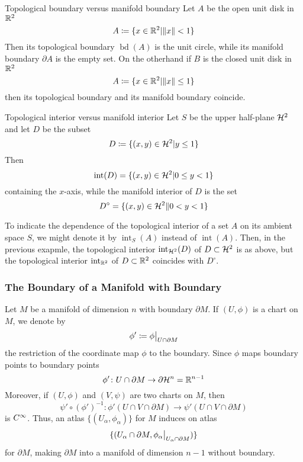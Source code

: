 \begin{example}{Topological boundary versus manifold boundary}{}
    Let \(A\) be the open unit disk in \(\mathbb{R}^2\)
    \[
        A \coloneqq \{ x \in \mathbb{R}^2 | \norm{x} < 1 \}    
    \]
    Then its topological boundary \(\operatorname{bd}(A)\) is the unit circle, while its manifold boundary \(\partial A\) is the empty set.
    On the otherhand if \(B\) is the closed unit disk in \(\mathbb{R}^2\)
    \[
        A \coloneqq \{ x \in \mathbb{R}^2 | \norm{x} \leq 1 \}    
    \]
    then its topological boundary and its manifold boundary coincide.
\end{example}
\begin{example}{Topological interior versus manifold interior}{}
    Let \(S\) be the upper half-plane \(\mathcal{H}^2\) and let \(D\) be the subset 
    \[
        D \coloneqq \{ (x,y) \in \mathcal{H}^2 | y \leq 1 \}    
    \]
    Then 
    \[
        \operatorname{int}(D) = \{(x,y) \in \mathcal{H}^2 | 0 \leq y < 1\}   
    \]
    containing the \(x\)-axis, while the manifold interior of \(D\) is the set 
    \[
        D^\circ = \{ (x,y) \in \mathcal{H}^2 \| 0 < y < 1 \}    
    \]
\end{example}

To indicate the dependence of the topological interior of a set \(A\) on its ambient space \(S\), we might denote it by \(\operatorname{int}_S (A)\) instead of \(\operatorname{int}(A)\).
Then, in the previous exapmle, the topological interior \(\operatorname{int}_{\mathcal{H}^2}(D)\) of \(D \subset \mathcal{H}^2\) is as above, but the topological interior \(\operatorname{int}_{\mathbb{R}^2}\) of \(D \subset \mathbb{R}^2\) coincides with \(D^\circ\).

\subsubsection{The Boundary of a Manifold with Boundary}

Let \(M\) be a manifold of dimension \(n\) with boundary \(\partial M\). 
If \((U, \phi)\) is a chart on \(M\), we denote by 
\[
    \phi' \coloneqq \evalat[\big]{\phi}{U \cap \partial M}
\]
the restriction of the coordinate map \(\phi\) to the boundary.
Since \(\phi\) maps boundary points to boundary points 
\[
    \phi' \colon U \cap \partial M \rightarrow \partial \mathcal{H}^n = \mathbb{R}^{n-1}    
\]
Moreover, if \((U, \phi)\) and \((V, \psi)\) are two charts on \(M\), then 
\[
    \psi' \circ (\phi')^{-1} \colon \phi'(U \cap V \cap \partial M) \rightarrow \psi'(U \cap V \cap \partial M)   
\]
is \(C^\infty\).
Thus, an atlas \(\{ (U_\alpha, \phi_\alpha) \}\) for \(M\) induces on atlas 
\[
    \{ (U_\alpha \cap \partial M, \evalat[\big]{\phi_\alpha}{U_\alpha \cap \partial M}) \}
\]  
for \(\partial M\), making \(\partial M\) into a manifold of dimension \(n-1\) without boundary.


